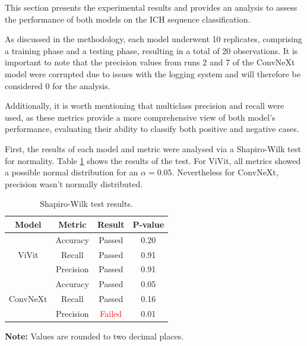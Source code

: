 This section presents the experimental results and provides an analysis to assess the performance of both models on the ICH sequence classification.

As discussed in the methodology, each model underwent 10 replicates, comprising a training phase and a testing phase, resulting in a total of 20 observations. It is important to note that the precision values from runs 2 and 7 of the ConvNeXt model were corrupted due to issues with the logging system and will therefore be considered 0 for the analysis.

Additionally, it is worth mentioning that multiclass precision and recall were used, as these metrics provide a more comprehensive view of both model's performance, evaluating their ability to classify both positive and negative cases.

First, the results of each model and metric were analysed via a Shapiro-Wilk test for normality. Table \ref{tab:shapiro_results} shows the results of the test. For ViVit, all metrics showed a possible normal distribution for an $\alpha = 0.05$. Nevertheless for ConvNeXt, precision wasn't normally distributed.

\begin{table}[h]
    \centering
    \caption{Shapiro-Wilk test results.}
    \renewcommand{\arraystretch}{1.5}
    \begin{tabular}{|c|c|c|c|}
        \hline
        \textbf{Model} & \textbf{Metric} & \textbf{Result} & \textbf{P-value} \\ \hline
        \multirow{3}{*}{ViVit} & Accuracy & Passed & 0.20 \\ \cline{2-4}
                              & Recall & Passed & 0.91 \\ \cline{2-4}
                              & Precision & Passed & 0.91 \\ \hline
        \multirow{3}{*}{ConvNeXt} & Accuracy & Passed & 0.05 \\ \cline{2-4}
                                  & Recall & Passed & 0.16 \\ \cline{2-4}
                                  & Precision & \textcolor{red}{Failed} & 0.01 \\ \hline
    \end{tabular}
    \begin{center}
        \parbox{\columnwidth}{\centering \footnotesize \textbf{Note:} Values are rounded to two decimal places.}
    \end{center}
\label{tab:shapiro_results}
\end{table}

